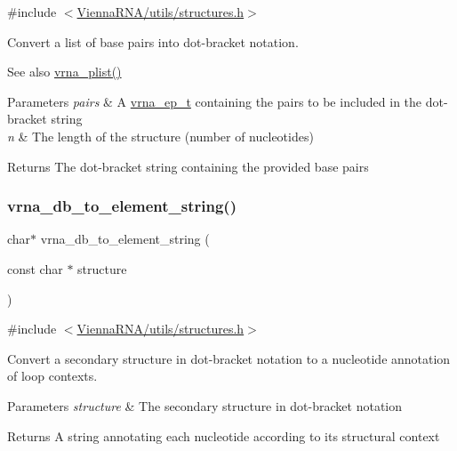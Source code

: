 {\ttfamily \#include $<$\hyperlink{utils_2structures_8h}{Vienna\+R\+N\+A/utils/structures.\+h}$>$}



Convert a list of base pairs into dot-\/bracket notation. 

\begin{DoxySeeAlso}{See also}
\hyperlink{group__struct__utils__plist_gaf002d69024d709744664a8b9ca3dd77d}{vrna\+\_\+plist()} 
\end{DoxySeeAlso}

\begin{DoxyParams}{Parameters}
{\em pairs} & A \hyperlink{group__struct__utils__plist_gab9ac98ab55ded9fb90043b024b915aca}{vrna\+\_\+ep\+\_\+t} containing the pairs to be included in the dot-\/bracket string \\
\hline
{\em n} & The length of the structure (number of nucleotides) \\
\hline
\end{DoxyParams}
\begin{DoxyReturn}{Returns}
The dot-\/bracket string containing the provided base pairs 
\end{DoxyReturn}
\mbox{\label{group__struct__utils__dot__bracket_ga45360c09fb6d04d96e42dcccbb66015b}} 
\subsubsection{\texorpdfstring{vrna\+\_\+db\+\_\+to\+\_\+element\+\_\+string()}{vrna\_db\_to\_element\_string()}}
{\footnotesize\ttfamily char$\ast$ vrna\+\_\+db\+\_\+to\+\_\+element\+\_\+string (\begin{DoxyParamCaption}\item[{const char $\ast$}]{structure }\end{DoxyParamCaption})}



{\ttfamily \#include $<$\hyperlink{utils_2structures_8h}{Vienna\+R\+N\+A/utils/structures.\+h}$>$}



Convert a secondary structure in dot-\/bracket notation to a nucleotide annotation of loop contexts. 


\begin{DoxyParams}{Parameters}
{\em structure} & The secondary structure in dot-\/bracket notation \\
\hline
\end{DoxyParams}
\begin{DoxyReturn}{Returns}
A string annotating each nucleotide according to it\textquotesingle{}s structural context 
\end{DoxyReturn}
